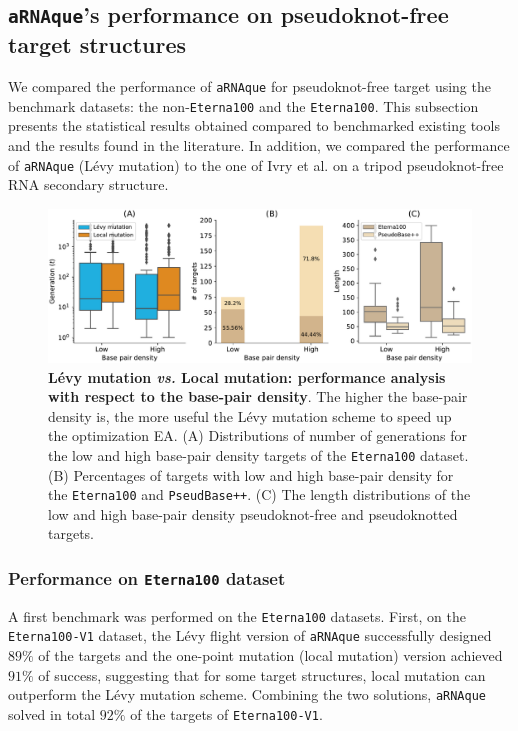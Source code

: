 \subsection{\texttt{aRNAque}'s performance on pseudoknot-free target structures }
We compared the performance of \texttt{aRNAque} for pseudoknot-free target using the benchmark datasets: the non-\texttt{Eterna100} and the \texttt{Eterna100}. This subsection presents the statistical results obtained compared to benchmarked existing tools and the results found in the literature. In addition, we compared the performance of \texttt{aRNAque} (Lévy mutation) to the one of Ivry et al. \cite{ivry2009image} on a tripod pseudoknot-free \ac{RNA} secondary structure.

\begin{figure}[t!]
	\includegraphics[width=1.\linewidth]{../res/images/arnaque/fig10.pdf}
	\caption{\textbf{Lévy mutation \emph{vs.} Local mutation: performance analysis with respect to the base-pair density}. The higher the base-pair density is, the more useful the Lévy mutation scheme to speed up the optimization \ac{EA}. (A) Distributions of number of generations for the low and high base-pair density targets of the \texttt{Eterna100} dataset. (B) Percentages of targets with low and high base-pair density for the \texttt{Eterna100} and \texttt{PseudBase++}. (C) The length distributions of the low and high base-pair density pseudoknot-free and pseudoknotted targets.} \label{Fig:eterna_performance}
\end{figure}  

\subsubsection{Performance on \texttt{Eterna100} dataset}

A first benchmark was performed on the \texttt{Eterna100} datasets. First, on the \texttt{Eterna100-V1} dataset, the Lévy flight version of \texttt{aRNAque} successfully designed $89\%$ of the targets and the one-point mutation (local mutation) version achieved $91\%$ of success, suggesting that for some target structures, local mutation can outperform the Lévy mutation scheme. Combining the two solutions, \texttt{aRNAque} solved in total $92\%$ of the targets of \texttt{Eterna100-V1}.

